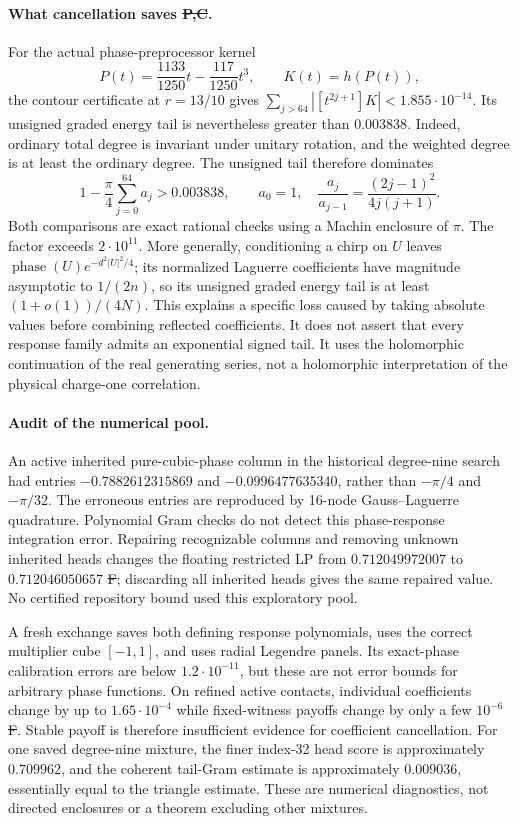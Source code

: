 \paragraph{What cancellation saves \st{P,C}.}
For the actual phase-preprocessor kernel
\[
 P(t)=\frac{1133}{1250}t-\frac{117}{1250}t^3,
 \qquad K(t)=h(P(t)),
\]
the contour certificate at $r=13/10$ gives
$\sum_{j>64}|[t^{2j+1}]K|<1.855\cdot10^{-14}$.
Its unsigned graded energy tail is nevertheless greater than
$0.003838$. Indeed, ordinary total degree is invariant under unitary
rotation, and the weighted degree is at least the ordinary degree.
The unsigned tail therefore dominates
\[
 1-\frac\pi4\sum_{j=0}^{64}a_j>0.003838,
 \qquad a_0=1,\quad
 \frac{a_j}{a_{j-1}}=\frac{(2j-1)^2}{4j(j+1)}.
\]
Both comparisons are exact rational checks using a Machin enclosure
of $\pi$. The factor exceeds $2\cdot10^{11}$. More generally,
conditioning a chirp on $U$ leaves
$\operatorname{phase}(U)e^{-d^2|U|^2/4}$; its normalized Laguerre
coefficients have magnitude asymptotic to $1/(2n)$, so its unsigned
graded energy tail is at least $(1+o(1))/(4N)$.
This explains a specific loss caused by taking absolute values before
combining reflected coefficients. It does not assert that every
response family admits an exponential signed tail. It uses the
holomorphic continuation of the real generating series, not a
holomorphic interpretation of the physical charge-one correlation.

\paragraph{Audit of the numerical pool.}
An active inherited pure-cubic-phase column in the historical
degree-nine search had entries
$-0.7882612315869$ and $-0.0996477635340$, rather than
$-\pi/4$ and $-\pi/32$. The erroneous entries are reproduced by
16-node Gauss--Laguerre quadrature. Polynomial Gram checks do not
detect this phase-response integration error. Repairing recognizable
columns and removing unknown inherited heads changes the floating
restricted LP from $0.712049972007$ to $0.712046050657$ \st{F};
discarding all inherited heads gives the same repaired value.
No certified repository bound used this exploratory pool.

A fresh exchange saves both defining response polynomials, uses the
correct multiplier cube $[-1,1]$, and uses radial Legendre panels.
Its exact-phase calibration errors are below $1.2\cdot10^{-11}$,
but these are not error bounds for arbitrary phase functions.
On refined active contacts, individual coefficients change by up to
$1.65\cdot10^{-4}$ while fixed-witness payoffs change by only a few
$10^{-6}$ \st{F}. Stable payoff is therefore insufficient evidence
for coefficient cancellation. For one saved degree-nine mixture,
the finer index-32 head score is approximately $0.709962$, and the
coherent tail-Gram estimate is approximately $0.009036$, essentially
equal to the triangle estimate. These are numerical diagnostics,
not directed enclosures or a theorem excluding other mixtures.

